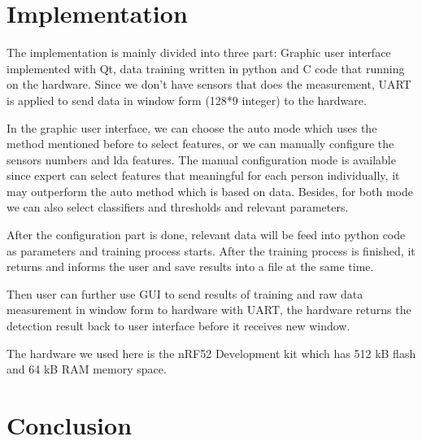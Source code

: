 \documentclass[article]{article}
\begin{document}
\section{Implementation}
   The implementation is mainly divided into three part: Graphic user interface implemented with Qt, data training written in python and C code that running on the hardware. Since we don't have sensors that does the measurement, UART is applied to send data in window form (128*9 integer) to the hardware.      
   
   In the graphic user interface, we can choose the auto mode which uses the method mentioned before to select features, or we can manually configure the sensors numbers and lda features. The manual configuration mode is available since expert can select features that meaningful for each person individually, it may outperform the auto method which is based on data. Besides, for both mode we can also select classifiers and thresholds and relevant parameters. 
   
   After the configuration part is done, relevant data will be feed into python code as parameters and training process starts. After the training process is finished, it returns and informs the user and save results into a file at the same time. 
   
   Then user can further use GUI to send results of training and raw data measurement in window form to hardware with UART, the hardware returns the detection result back to user interface before it receives new window.
   
   The hardware we used here is the nRF52 Development kit which has 512 kB flash and 64 kB RAM memory space.  
   
   
  
\section{Conclusion}
\lipsum[1]
\lipsum[1]
    



\nocite{*}
		
\end{document}
